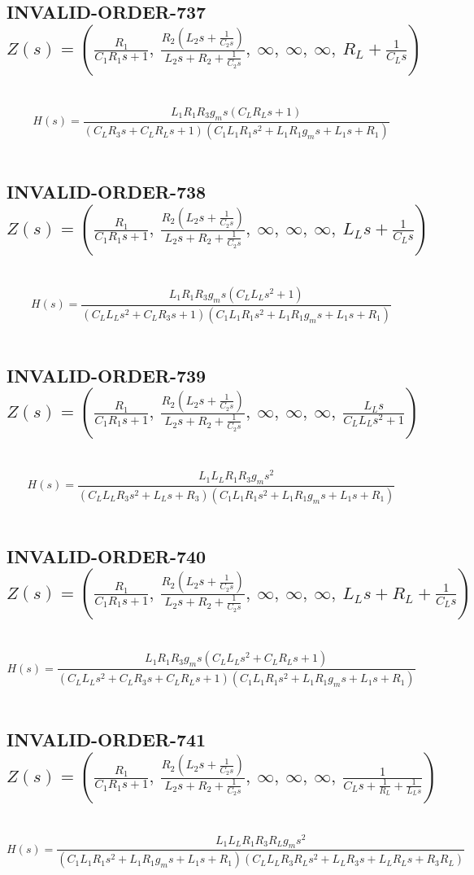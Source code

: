 \documentclass{article}
\begin{document}
\subsection{INVALID-ORDER-737 $Z(s) = \left( \frac{R_{1}}{C_{1} R_{1} s + 1}, \  \frac{R_{2} \left(L_{2} s + \frac{1}{C_{2} s}\right)}{L_{2} s + R_{2} + \frac{1}{C_{2} s}}, \  \infty, \  \infty, \  \infty, \  R_{L} + \frac{1}{C_{L} s}\right)$ } \ 
\textbf{\[H(s) = \frac{L_{1} R_{1} R_{3} g_{m} s \left(C_{L} R_{L} s + 1\right)}{\left(C_{L} R_{3} s + C_{L} R_{L} s + 1\right) \left(C_{1} L_{1} R_{1} s^{2} + L_{1} R_{1} g_{m} s + L_{1} s + R_{1}\right)}\] } \ 
\subsection{INVALID-ORDER-738 $Z(s) = \left( \frac{R_{1}}{C_{1} R_{1} s + 1}, \  \frac{R_{2} \left(L_{2} s + \frac{1}{C_{2} s}\right)}{L_{2} s + R_{2} + \frac{1}{C_{2} s}}, \  \infty, \  \infty, \  \infty, \  L_{L} s + \frac{1}{C_{L} s}\right)$ } \ 
\textbf{\[H(s) = \frac{L_{1} R_{1} R_{3} g_{m} s \left(C_{L} L_{L} s^{2} + 1\right)}{\left(C_{L} L_{L} s^{2} + C_{L} R_{3} s + 1\right) \left(C_{1} L_{1} R_{1} s^{2} + L_{1} R_{1} g_{m} s + L_{1} s + R_{1}\right)}\] } \ 
\subsection{INVALID-ORDER-739 $Z(s) = \left( \frac{R_{1}}{C_{1} R_{1} s + 1}, \  \frac{R_{2} \left(L_{2} s + \frac{1}{C_{2} s}\right)}{L_{2} s + R_{2} + \frac{1}{C_{2} s}}, \  \infty, \  \infty, \  \infty, \  \frac{L_{L} s}{C_{L} L_{L} s^{2} + 1}\right)$ } \ 
\textbf{\[H(s) = \frac{L_{1} L_{L} R_{1} R_{3} g_{m} s^{2}}{\left(C_{L} L_{L} R_{3} s^{2} + L_{L} s + R_{3}\right) \left(C_{1} L_{1} R_{1} s^{2} + L_{1} R_{1} g_{m} s + L_{1} s + R_{1}\right)}\] } \ 
\subsection{INVALID-ORDER-740 $Z(s) = \left( \frac{R_{1}}{C_{1} R_{1} s + 1}, \  \frac{R_{2} \left(L_{2} s + \frac{1}{C_{2} s}\right)}{L_{2} s + R_{2} + \frac{1}{C_{2} s}}, \  \infty, \  \infty, \  \infty, \  L_{L} s + R_{L} + \frac{1}{C_{L} s}\right)$ } \ 
\textbf{\[H(s) = \frac{L_{1} R_{1} R_{3} g_{m} s \left(C_{L} L_{L} s^{2} + C_{L} R_{L} s + 1\right)}{\left(C_{L} L_{L} s^{2} + C_{L} R_{3} s + C_{L} R_{L} s + 1\right) \left(C_{1} L_{1} R_{1} s^{2} + L_{1} R_{1} g_{m} s + L_{1} s + R_{1}\right)}\] } \ 
\subsection{INVALID-ORDER-741 $Z(s) = \left( \frac{R_{1}}{C_{1} R_{1} s + 1}, \  \frac{R_{2} \left(L_{2} s + \frac{1}{C_{2} s}\right)}{L_{2} s + R_{2} + \frac{1}{C_{2} s}}, \  \infty, \  \infty, \  \infty, \  \frac{1}{C_{L} s + \frac{1}{R_{L}} + \frac{1}{L_{L} s}}\right)$ } \ 
\textbf{\[H(s) = \frac{L_{1} L_{L} R_{1} R_{3} R_{L} g_{m} s^{2}}{\left(C_{1} L_{1} R_{1} s^{2} + L_{1} R_{1} g_{m} s + L_{1} s + R_{1}\right) \left(C_{L} L_{L} R_{3} R_{L} s^{2} + L_{L} R_{3} s + L_{L} R_{L} s + R_{3} R_{L}\right)}\] } \ 
\end{document}
